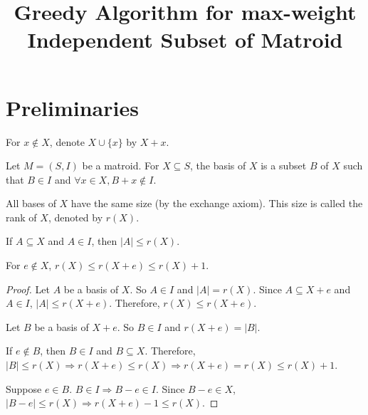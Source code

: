 

\title{Greedy Algorithm for max-weight Independent Subset of Matroid}



\maketitle
\initMinimal{}

\tableofcontents

\section{Preliminaries}

For $x \not\in X$, denote $X \cup \{x\}$ by $X + x$.

Let $M = (S, I)$ be a matroid.
For $X \subseteq S$, the basis of $X$ is a subset $B$ of $X$
such that $B \in I$ and $\forall x \in X, B + x \not\in I$.

All bases of $X$ have the same size (by the exchange axiom).
This size is called the rank of $X$, denoted by $r(X)$.

\begin{theorem}
If $A \subseteq X$ and $A \in I$, then $|A| \le r(X)$.
\end{theorem}

\begin{theorem}
For $e \not\in X$, $r(X) \le r(X+e) \le r(X) + 1$.
\end{theorem}
\begin{proof}
Let $A$ be a basis of $X$. So $A \in I$ and $|A| = r(X)$.
Since $A \subseteq X+e$ and $A \in I$, $|A| \le r(X+e)$.
Therefore, $r(X) \le r(X+e)$.

Let $B$ be a basis of $X+e$. So $B \in I$ and $r(X+e) = |B|$.

If $e \not\in B$, then $B \in I$ and $B \subseteq X$.
Therefore, $|B| \le r(X) \Rightarrow r(X+e) \le r(X) \Rightarrow r(X+e) = r(X) \le r(X) + 1$.

Suppose $e \in B$. $B \in I \Rightarrow B-e \in I$.
Since $B-e \in X$, $|B-e| \le r(X) \Rightarrow r(X+e) - 1 \le r(X)$.
\end{proof}

